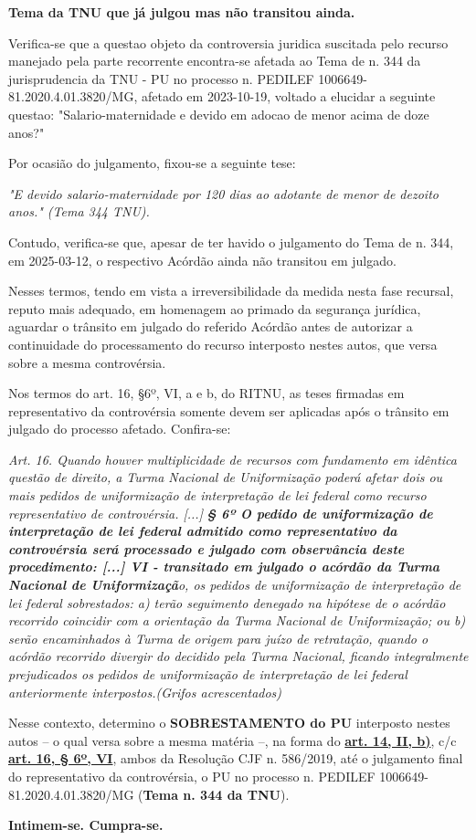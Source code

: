 \documentclass[12pt]{article}
\begin{document}
\justifying
\noindent \textbf{Tema da TNU que já julgou mas não transitou ainda. }

\noindent Verifica-se que a questao objeto da controversia juridica suscitada pelo recurso manejado pela parte recorrente encontra-se afetada ao Tema de n. 344 da jurisprudencia da TNU - PU no processo n. PEDILEF 1006649-81.2020.4.01.3820/MG, afetado em 2023-10-19, voltado a elucidar a seguinte questao: "Salario-maternidade e devido em adocao de menor acima de doze anos?"

\noindent Por ocasião do julgamento, fixou-se a seguinte tese:

\noindent \textit{"E devido salario-maternidade por 120 dias ao adotante de menor de dezoito anos." (Tema 344 TNU).}

\noindent Contudo, verifica-se que, apesar de ter havido o julgamento do Tema de n. 344, em 2025-03-12, o respectivo Acórdão ainda não transitou em julgado.

\noindent Nesses termos, tendo em vista a irreversibilidade da medida nesta fase recursal, reputo mais adequado, em homenagem ao primado da segurança jurídica, aguardar o trânsito em julgado do referido Acórdão antes de autorizar a continuidade do processamento do recurso interposto nestes autos, que versa sobre a mesma controvérsia.

\noindent Nos termos do art. 16, §6º, VI, a e b,  do RITNU, as teses firmadas em representativo da controvérsia somente devem ser aplicadas após o trânsito em julgado do processo afetado. Confira-se:

\noindent \textit{Art. 16. Quando houver multiplicidade de recursos com fundamento em idêntica questão de direito, a Turma Nacional de Uniformização poderá afetar dois ou mais pedidos de uniformização de interpretação de lei federal como recurso representativo de controvérsia. [...] }\textit{\textbf{§ 6º O pedido de uniformização de interpretação de lei federal admitido como representativo da controvérsia será processado e julgado com observância deste procedimento: [...] VI - transitado em julgado o acórdão da Turma Nacional de Uniformizaçã}}\textit{o, os pedidos de uniformização de interpretação de lei federal sobrestados: a) terão seguimento denegado na hipótese de o acórdão recorrido coincidir com a orientação da Turma Nacional de Uniformização; ou b) serão encaminhados à Turma de origem para juízo de retratação, quando o acórdão recorrido divergir do decidido pela Turma Nacional, ficando integralmente prejudicados os pedidos de uniformização de interpretação de lei federal anteriormente interpostos.(Grifos acrescentados)}

\noindent Nesse contexto, determino o \textbf{SOBRESTAMENTO do PU} interposto nestes autos – o qual versa sobre a mesma matéria –, na forma do \uline{\textbf{art. 14, II, b)}},\textbf{ }c/c\textbf{ }\uline{\textbf{art. 16, § 6º, VI}}, ambos da Resolução CJF n. 586/2019, até o julgamento final do representativo da controvérsia, o PU no processo n. PEDILEF 1006649-81.2020.4.01.3820/MG (\textbf{Tema n. 344 da TNU}).

\noindent \textbf{Intimem-se. Cumpra-se.}
\end{document}
